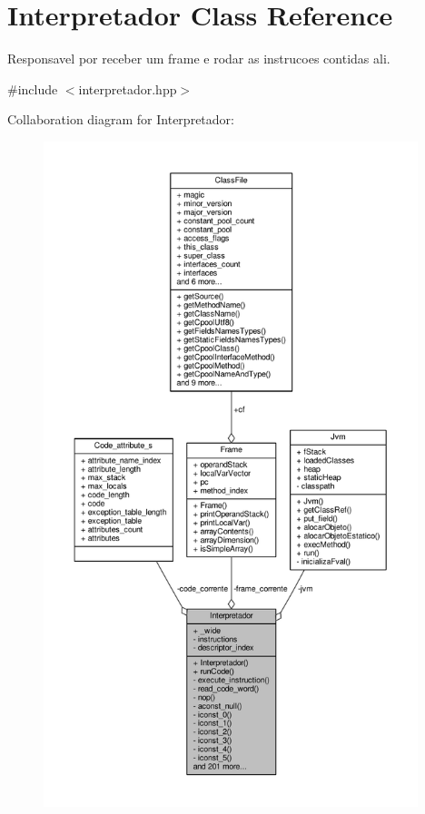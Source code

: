 \hypertarget{classInterpretador}{\section{Interpretador Class Reference}
\label{classInterpretador}
}


Responsavel por receber um frame e rodar as instrucoes contidas ali.  




{\ttfamily \#include $<$interpretador.\+hpp$>$}



Collaboration diagram for Interpretador\+:
\nopagebreak
\begin{figure}[H]
\begin{center}
\leavevmode
\includegraphics[height=550pt]{classInterpretador__coll__graph}
\end{center}
\end{figure}
